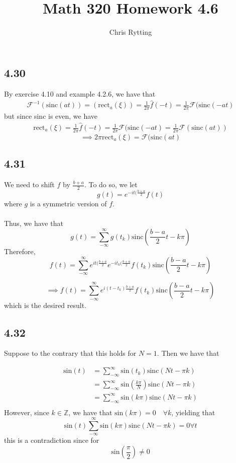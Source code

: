 \documentclass[letterpaper,12pt]{article}
\theoremstyle{definition}
\begin{document}
\title{Math 320 Homework 4.6}
\author{Chris Rytting}
\maketitle

\subsection*{4.30}

By exercise 4.10 and example 4.2.6, we have that
\begin{align*}
    \mathscr{F}^{-1}( \text{sinc} (at)) =  (\text{rect}_a(\xi) ) = \frac{1}{2    \pi} \hat f(-t) = \frac{1}{2 \pi} \mathscr{F}(\text{sinc} (-at)
\end{align*}
but since sinc is even, we have
\begin{align*}
    \text{rect}_a(\xi)  = \frac{1}{2    \pi} \hat f(-t) = \frac{1}{2 \pi} \mathscr{F}(\text{sinc} (-at) = \frac{1}{2 \pi} \mathscr{F}(\text{sinc} (at))
\end{align*}
\[\implies 2 \pi \text{rect}_a(\xi) = \mathscr{F}(\text{sinc} (at)\]

\subsection*{4.31}

We need to shift $f$ by $\frac{b+a}{2}$. To do so, we let 
\[g(t) = e^{-it (\frac{b+a}{2}} f(t) \]
where $g$ is a symmetric version of $f$.\\\\
Thus, we have that 
\[g(t) = \sum^{\infty}_{-\infty} g(t_k) \text{sinc} (\frac{b-a}{2}t - k \pi)\]
Therefore,
\[f(t) = \sum^{\infty}_{-\infty} e^{it (\frac{b+a}{2}} e^{-it_k (\frac{b+a}{2}} f(t_k) \text{sinc} (\frac{b-a}{2}t - k \pi) \]

\[\implies f(t) = \sum^{\infty}_{-\infty} e^{i(t-t_k) \frac{b+a}{2}} f(t_k) \text{sinc} (\frac{b-a}{2}t - k \pi) \] 
which is the desired result.
\subsection*{4.32}

Suppose to the contrary that this holds for $N=1$. Then we have that

\begin{align*}
    \text{sin} (t)&= \sum^{\infty}_{-\infty} \text{sin} (t_k) \text{sinc} (Nt - \pi k)  \\
    &= \sum^{\infty}_{-\infty} \text{sin} (\frac{k \pi}{N}) \text{sinc} (Nt - \pi k)  \\
    &= \sum^{\infty}_{-\infty} \text{sin} (k \pi) \text{sinc} (Nt - \pi k)  \\
\end{align*}
However, since $k \in \mathbb{Z}$, we have that $\text{sin} (k\pi) = 0 \quad \forall k$, yielding that
\[\text{sin} (t)  \sum^{\infty}_{-\infty} \text{sin} (k \pi) \text{sinc} (Nt - \pi k) = 0 \forall t\]
this is a contradiction since for 
\[\text{sin} (\frac{\pi}{2})  \neq 0\]
\end{document}
